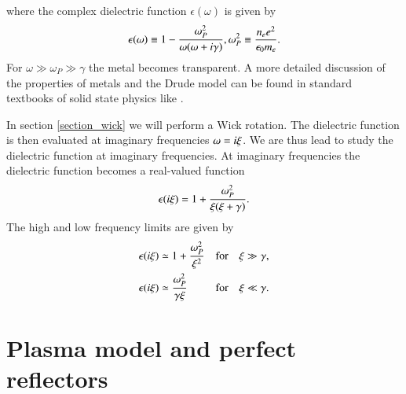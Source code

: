 where the complex dielectric function $\epsilon(\omega)$ is given by
\begin{equation}
\label{eq:drude_drude_complex}
\epsilon(\omega) \equiv 1-\frac{\omega_P^2}{\omega(\omega+i\gamma)}, \\
\omega_P^2 \equiv \frac{n_ee^2}{\epsilon_0 m_e}.
\end{equation}
For $\omega\gg\omega_P\gg\gamma$ the metal becomes transparent. A more detailed
discussion of the properties of metals and the Drude model can be found in
standard textbooks of solid state physics like \cite{ashcroft1976solid}.

In section \ref{section_wick} we will perform a Wick rotation. The dielectric
function is then evaluated at imaginary frequencies $\omega=i\xi$. We are
thus lead to study the dielectric function at imaginary frequencies. At
imaginary frequencies the dielectric function becomes a real-valued function
\begin{equation}
\epsilon(i\xi) = 1+\frac{\omega_P^2}{\xi(\xi+\gamma)}.
\end{equation}
The high and low frequency limits are given by
\begin{align}
\label{eq:drude_approx_drude_xih}
\epsilon(i\xi) &\simeq 1+\frac{\omega_P^2}{\xi^2}   & &\text{for} \quad \xi\gg\gamma, \\
\label{eq:drude_approx_drude_xi0}
\epsilon(i\xi) &\simeq \frac{\omega_P^2}{\gamma\xi} & &\text{for} \quad \xi\ll\gamma.
\end{align}


\section{Plasma model and perfect reflectors}

